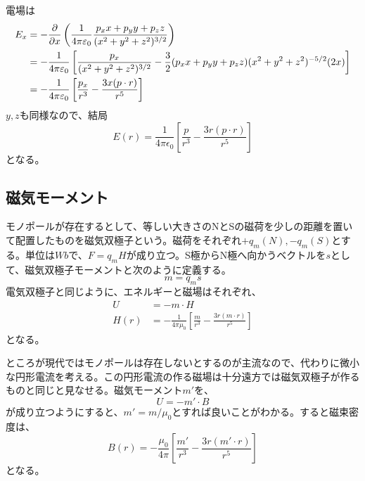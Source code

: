     電場は
    \begin{align*}
        E_x &= -\frac{\partial }{\partial x}\left(\frac{1}{4\pi\varepsilon_0}\frac{p_x x + p_y y + p_z z}{(x^2+y^2+z^2)^{3/2}}\right)\\
            &= -\frac{1}{4\pi\varepsilon_0}\left[\frac{p_x}{(x^2 + y^2 + z^2)^{3/2}} - \frac{3}{2}(p_x x + p_y y + p_z z)(x^2 + y^2 + z^2)^{-5/2}(2x)\right]\\
            &= -\frac{1}{4\pi\varepsilon_0}\left[\frac{p_x}{r^3} - \frac{3x(p \cdot r)}{r^5}\right]
    \end{align*}
    $y, z$も同様なので、結局
        \[E(r) = \frac{1}{4\pi\epsilon_0}\left[\frac{p}{r^3} - \frac{3r(p\cdot r)}{r^5}\right]\]
    となる。

\subsection{磁気モーメント}
    モノポールが存在するとして、等しい大きさのNとSの磁荷を少しの距離を置いて配置したものを磁気双極子という。磁荷をそれぞれ$+q_m(N), -q_m(S)$とする。単位は$Wb$で、$F = q_m H$が成り立つ。S極からN極へ向かうベクトルを$s$として、磁気双極子モーメントと次のように定義する。
        \[m = q_m s\]
    電気双極子と同じように、エネルギーと磁場はそれぞれ、
    \begin{align*}
        U &= -m \cdot H\\
        H(r) &= -\frac{1}{4\pi\mu_0}\left[\frac{m}{r^3} - \frac{3r(m\cdot r)}{r^5}\right]
    \end{align*}
    となる。

    ところが現代ではモノポールは存在しないとするのが主流なので、代わりに微小な円形電流を考える。この円形電流の作る磁場は十分遠方では磁気双極子が作るものと同じと見なせる。磁気モーメント$m'$を、
        \[U = -m' \cdot B\]
    が成り立つようにすると、$m' = m / \mu_0$とすれば良いことがわかる。すると磁束密度は、
        \[B(r) = -\frac{\mu_0}{4\pi}\left[\frac{m'}{r^3} - \frac{3r(m'\cdot r)}{r^5}\right]\]
    となる。

